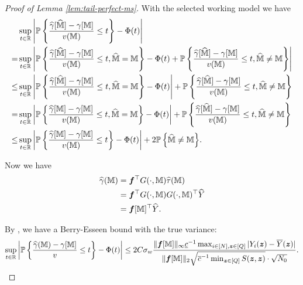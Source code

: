 \documentclass[12pt]{article}
\begin{document}
{
\begin{proof}[Proof of Lemma \ref{lem:tail-perfect-ms}]
With the selected working model we have
\begin{align*}
    &\sup_{t\in\bbR}\lt|\Prob{\frac{\hgamma[\hat{\bbM}]-\gamma[\bbM]}{v(\bbM)} \le t} - \Phi(t)\rt| \\
    = &\sup_{t\in\bbR}\lt|\Prob{\frac{\hgamma[\hat{\bbM}]-\gamma[\bbM]}{v(\bbM)} \le t, \hat{\bbM} = \bbM} - \Phi(t) + \Prob{\frac{\hgamma[\hat{\bbM}]-\gamma[\bbM]}{v(\bbM)} \le t, \hat{\bbM} \neq \bbM} \rt|\\
    \le &\sup_{t\in\bbR}\lt|\Prob{\frac{\hgamma[\hat{\bbM}]-\gamma[\bbM]}{v(\bbM)} \le t, \hat{\bbM} = \bbM} - \Phi(t)\rt| +  \Prob{\frac{\hgamma[\hat{\bbM}]-\gamma[\bbM]}{v(\bbM)} \le t, \hat{\bbM} \neq \bbM}  \\
    = &\sup_{t\in\bbR}\lt|\Prob{\frac{\hgamma[{\bbM}]-\gamma[\bbM]}{v(\bbM)} \le t, \hat{\bbM} = \bbM} - \Phi(t)\rt| +  \Prob{\frac{\hgamma[\hat{\bbM}]-\gamma[\bbM]}{v(\bbM)} \le t, \hat{\bbM} \neq \bbM}  \\
    \le & \sup_{t\in\bbR}\lt|\Prob{\frac{\hgamma[{\bbM}]-\gamma[\bbM]}{v(\bbM)} \le t} - \Phi(t)\rt| +  2\Prob{ \hat{\bbM} \neq \bbM}.
\end{align*}

Now we have 
\begin{align*}
    \hgamma(\bbM) &= \bsf^\top G(\cdot, \bbM) \htau(\bbM) \\
    & =  \bsf^\top G(\cdot, \bbM) G(\cdot, \bbM)^\top \hY \\
    & = {\bsf}[\bbM]^\top \hY.
\end{align*}


By ,  we have a Berry-Esseen bound with the true variance:
\begin{align*}
    \sup_{t\in\bbR}\lt|\Prob{\frac{\hgamma( {\bbM})-\gamma[\bbM]}{v} \le t} - \Phi(t)\rt| 
    \le  2C\sigma_w   \frac{\|{\bsf}[\bbM]\|_\infty\underline{c}^{-1} \max_{i\in[N],\bz\in[Q]}|Y_i(\bz)-\overline{Y}(\bz)|}{\|{\bsf}[\bbM] \|_2\sqrt{\overline{c}^{-1} \min_{\bz\in[Q]} S(\bz,\bz)}\cdot \sqrt{ N_0}}.  
\end{align*}
    
\end{proof}
}
\end{document}
